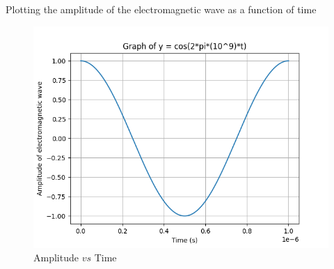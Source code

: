 \documentclass[journal,12pt,twocolumn]{IEEEtran}
\theoremstyle{remark}
\begin{document}
Plotting the amplitude of the electromagnetic wave as a function of time
\begin{figure}[h]
    \centering
    \includegraphics[width=\columnwidth]{Figure__1.png}
    \caption{Amplitude $vs$ Time}
    \label{fig:12.8.6.2}
\end{figure}
\end{document}
